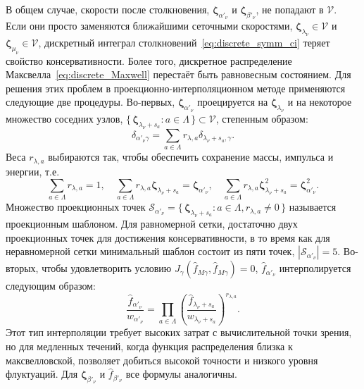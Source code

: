 \documentclass[
aps,%
12pt,%
final,%
notitlepage,%
oneside,%
onecolumn,%
nobibnotes,%
nofootinbib,%
superscriptaddress,%
noshowpacs,%
showkeys,%
centertags]%
{revtex4}
\newcommand{\bzeta}{\boldsymbol{\zeta}}
\newcommand{\Set}[2]{\{\,{#1}:{#2}\,\}}
\begin{document}
В общем случае, скорости после столкновения,
\(\bzeta_{\alpha'_\nu}\) и \(\bzeta_{\beta'_\nu}\), не попадают в \(\mathcal{V}\).
Если они просто заменяются ближайшими сеточными скоростями,
\(\bzeta_{\lambda_\nu}\in\mathcal{V}\) и \(\bzeta_{\mu_\nu}\in\mathcal{V}\),
дискретный интеграл столкновений~\eqref{eq:discrete_symm_ci} теряет свойство консервативности.
Более того, дискретное распределение Максвелла~\eqref{eq:discrete_Maxwell} перестаёт быть равновесным состоянием.
Для решения этих проблем в проекционно-интерполяционном методе применяются следующие две процедуры.
Во-первых, \(\bzeta_{\alpha'_\nu}\) проецируется на \(\bzeta_{\lambda_\nu}\) и
на некоторое множество соседних узлов, \(\Set{\bzeta_{\lambda_\nu+s_a}}{a\in\Lambda}\subset\mathcal{V}\),
степенным образом:
\begin{equation}\label{eq:ci_projection}
    \delta_{\alpha'_\nu\gamma} = \sum_{a\in\Lambda} r_{\lambda,a}\delta_{\lambda_\nu+s_a,\gamma}.
\end{equation}
Веса \(r_{\lambda,a}\) выбираются так, чтобы обеспечить сохранение массы, импульса и энергии, т.е.
\begin{equation}\label{eq:impact_conservation}
    \sum_{a\in\Lambda} r_{\lambda,a} = 1, \quad
    \sum_{a\in\Lambda} r_{\lambda,a} \bzeta_{\lambda_\nu+s_a} = \bzeta_{\alpha'_\nu}, \quad
    \sum_{a\in\Lambda} r_{\lambda,a} \bzeta_{\lambda_\nu+s_a}^2 = \bzeta_{\alpha'_\nu}^2.
\end{equation}
Множество проекционных точек \(\mathcal{S}_{\alpha'_\nu} = \Set{\bzeta_{\lambda_\nu+s_a}}{a\in\Lambda, r_{\lambda,a}\neq0}\)
называется проекционным шаблоном.
Для равномерной сетки, достаточно двух проекционных точек для достижения консервативности,
в то время как для неравномерной сетки минимальный шаблон состоит из пяти точек, \(|\mathcal{S}_{\alpha'_\nu}|=5\).
Во-вторых, чтобы удовлетворить условию \(J_\gamma(\hat{f}_{M\gamma}, \hat{f}_{M\gamma}) = 0\),
\(\hat{f}_{\alpha'_\nu}\) интерполируется следующим образом:
\begin{equation}\label{eq:ci_interpolation}
    \frac{\hat{f}_{\alpha'_\nu}}{w_{\alpha'_\nu}} = \prod_{a\in\Lambda}
        \left(\frac{\hat{f}_{\lambda_\nu+s_a}}{w_{\lambda_\nu+s_a}} \right)^{r_{\lambda,a}}.
\end{equation}
Этот тип интерполяции требует высоких затрат с вычислительной точки зрения,
но для медленных течений, когда функция распределения близка к максвелловской,
позволяет добиться высокой точности и низкого уровня флуктуаций.
Для \(\bzeta_{\beta'_\nu}\) и \(\hat{f}_{\beta'_\nu}\) все формулы аналогичны.
\end{document}

